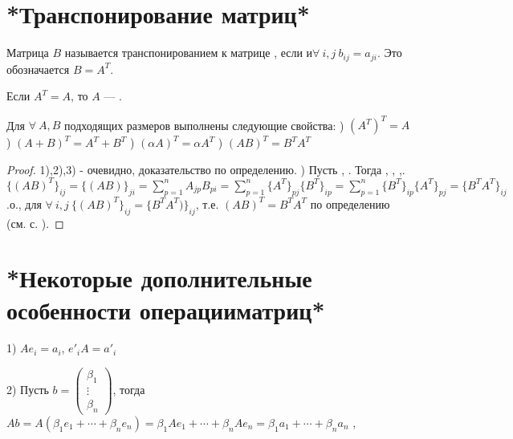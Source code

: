 \section{*Транспонирование матриц*}
\begin{opred}
Матрица $B$ называется транспонированием к матрице , если  и $\forall\ i,j\ b_{ij}=a_{ji}$. Это обозначается $B=A^T$.
\end{opred}
\begin{remark}
Если $A^T=A$, то $A$ --- .
\end{remark}
\begin{theor}
Для $\forall\ A,B$ подходящих размеров выполнены следующие свойства:
) $(A^T)^T=A$
) $(A+B)^T=A^T+B^T$
) $(\alpha{}A)^T=\alpha{}A^T$
) $(AB)^T=B^TA^T $
\end{theor}
\begin{proof}
1),2),3) - очевидно, доказательство по определению.
) Пусть , . Тогда , , ,\newline{}.
\newline$\{(AB)^T\}_{ij}=\{(AB)\}_{ji}=\sum\limits_{p=1}^nA_{jp}B_{pi}=\sum\limits_{p=1}^n\{A^T\}_{pj}\{B^T\}_{ip}=\sum\limits_{p=1}^n\{B^T\}_{ip}\{A^T\}_{pj}=\{B^TA^T\}_{ij}$
.о., для $\forall\ i,j\ \{(AB)^T\}_{ij}=\{B^TA^T)\}_{ij}$, т.е. $(AB)^T=B^TA^T$ по определению (см. с. \pageref{eq_matrices}).
\end{proof}
\section{*Некоторые дополнительные особенности операции матриц*}
1) $Ae_i=a_i$, $e'_iA=a'_i$

2) Пусть $b=\begin{pmatrix}\beta_1 \\ \vdots \\ \beta_n\end{pmatrix}$, тогда $Ab=A(\beta_1e_1+\cdots+\beta_ne_n)=\beta_1Ae_1+\cdots+\beta_nAe_n=\beta_1a_1+\cdots+\beta_na_n$
\newline{}
, 

